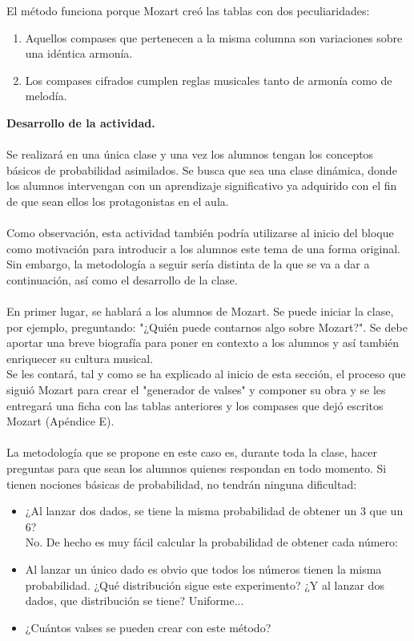 \documentclass[a4paper, openright, 11pt, titlepage]{report}
\theoremstyle{definition}\newtheorem{defin}[propo]{Definition}
\theoremstyle{definition}\newtheorem{obser}[propo]{Remark}
\theoremstyle{definition}\newtheorem{ejem}[propo]{Ejemplo}
\theoremstyle{definition}\newtheorem{algoritmo}[propo]{Algoritmo}
\begin{document}
El método funciona porque Mozart creó las tablas con dos peculiaridades:
\begin{enumerate}
    \item Aquellos compases que pertenecen a la misma columna son variaciones sobre una idéntica armonía.
    \item Los compases cifrados cumplen reglas musicales tanto de armonía como de melodía.
\end{enumerate}
\textbf{Desarrollo de la actividad.}\\\\
Se realizará en una única clase y una vez los alumnos tengan los conceptos básicos de probabilidad asimilados. Se busca que sea una clase dinámica, donde los alumnos intervengan con un aprendizaje significativo ya adquirido con el fin de que sean ellos los protagonistas en el aula.\\\\
Como observación, esta actividad también podría utilizarse al inicio del bloque como motivación para introducir a los alumnos este tema de una forma original. Sin embargo, la metodología a seguir sería distinta de la que se va a dar a continuación, así como el desarrollo de la clase.\\\\
En primer lugar, se hablará a los alumnos de Mozart. Se puede iniciar la clase, por ejemplo, preguntando: "¿Quién puede contarnos algo sobre Mozart?". Se debe aportar una breve biografía para poner en contexto a los alumnos y así también enriquecer su cultura musical.\\
Se les contará, tal y como se ha explicado al inicio de esta sección, el proceso que siguió Mozart para crear el "generador de valses" y componer su obra y se les entregará una ficha con las tablas anteriores y los compases que dejó escritos Mozart (Apéndice E).\\\\
La metodología que se propone en este caso es, durante toda la clase, hacer preguntas para que sean los alumnos quienes respondan en todo momento. Si tienen nociones básicas de probabilidad, no tendrán ninguna dificultad:
\begin{itemize}
    \item ¿Al lanzar dos dados, se tiene la misma probabilidad de obtener un 3 que un 6?\\
    No. De hecho es muy fácil calcular la probabilidad de obtener cada número:
    \item Al lanzar un único dado es obvio que todos los números tienen la misma probabilidad. ¿Qué distribución sigue este experimento? ¿Y al lanzar dos dados, que distribución se tiene?
    Uniforme...
    \item ¿Cuántos valses se pueden crear con este método?
    
\end{itemize}
\end{document}
